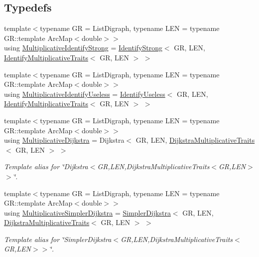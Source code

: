 \subsection*{Typedefs}
\begin{DoxyCompactItemize}
\item 
{\footnotesize template$<$typename GR  = List\+Digraph, typename L\+EN  = typename G\+R\+::template Arc\+Map$<$double$>$$>$ }\\using \hyperlink{namespacelemon_ad1a4144cc98e6319e6e0c6144223631e}{Multiplicative\+Identify\+Strong} = \hyperlink{classlemon_1_1_identify_strong}{Identify\+Strong}$<$ GR, L\+EN, \hyperlink{structlemon_1_1_identify_multiplicative_traits}{Identify\+Multiplicative\+Traits}$<$ GR, L\+EN $>$ $>$
\item 
{\footnotesize template$<$typename GR  = List\+Digraph, typename L\+EN  = typename G\+R\+::template Arc\+Map$<$double$>$$>$ }\\using \hyperlink{namespacelemon_a228c186b3cf4726455a5f4930d89b9cd}{Multiplicative\+Identify\+Useless} = \hyperlink{classlemon_1_1_identify_useless}{Identify\+Useless}$<$ GR, L\+EN, \hyperlink{structlemon_1_1_identify_multiplicative_traits}{Identify\+Multiplicative\+Traits}$<$ GR, L\+EN $>$ $>$
\item 
{\footnotesize template$<$typename GR  = List\+Digraph, typename L\+EN  = typename G\+R\+::template Arc\+Map$<$double$>$$>$ }\\using \hyperlink{namespacelemon_a08ac5476d368240ee966058c30364c62}{Multiplicative\+Dijkstra} = Dijkstra$<$ GR, L\+EN, \hyperlink{structlemon_1_1_dijkstra_multiplicative_traits}{Dijkstra\+Multiplicative\+Traits}$<$ GR, L\+EN $>$ $>$
\begin{DoxyCompactList}\small\item\em Template alias for \char`\"{}\+Dijkstra$<$\+G\+R,\+L\+E\+N,\+Dijkstra\+Multiplicative\+Traits$<$\+G\+R,\+L\+E\+N$>$$>$\char`\"{}. \end{DoxyCompactList}\item 
{\footnotesize template$<$typename GR  = List\+Digraph, typename L\+EN  = typename G\+R\+::template Arc\+Map$<$double$>$$>$ }\\using \hyperlink{namespacelemon_af6f169c21619a4d51dcf5f33c3d5b1cb}{Multiplicative\+Simpler\+Dijkstra} = \hyperlink{classlemon_1_1_simpler_dijkstra}{Simpler\+Dijkstra}$<$ GR, L\+EN, \hyperlink{structlemon_1_1_dijkstra_multiplicative_traits}{Dijkstra\+Multiplicative\+Traits}$<$ GR, L\+EN $>$ $>$
\begin{DoxyCompactList}\small\item\em Template alias for \char`\"{}\+Simpler\+Dijkstra$<$\+G\+R,\+L\+E\+N,\+Dijkstra\+Multiplicative\+Traits$<$\+G\+R,\+L\+E\+N$>$$>$\char`\"{}. \end{DoxyCompactList}\end{DoxyCompactItemize}


